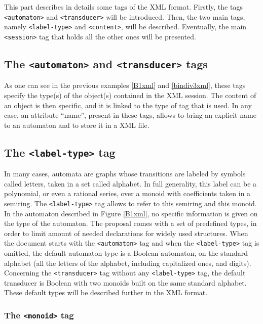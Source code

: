 \documentclass[a4paper]{article}
\def\typetag{\texttt{<label-type>}}
\def\contenttag{\texttt{<content>}}
\def\sessiontag{\texttt{<session>}}
\def\automatontag{\texttt{<automaton>}}
\def\transducertag{\texttt{<transducer>}}
\def\monoidtag{\texttt{<monoid>}}
\begin{document}
This part describes in details some tags of the XML format.
Firstly, the tags \automatontag{} and \transducertag{} will be introduced.
Then, the two main tags, namely \typetag{} and \contenttag{}, will be described.
Eventually, the main \sessiontag{} tag that holds all the other ones will be
presented.

\subsection{The \automatontag{} and \transducertag{} tags}

As one can see in the previous examples \ref{B1xml} and \ref{bindiv3xml}, these
tags specify the type(s) of the object(s) contained in the XML session. The content
of an object is then specific, and it is linked to the type of tag that is used.
In any case, an attribute ``name'', present in these tags, allows to bring an
explicit name to an automaton and to store it in a XML file.

\subsection{The \typetag{} tag}

In many cases, automata are graphs whose transitions are labeled by
symbols called letters, taken in a set called alphabet. In full
generality, this label can be a polynomial, or even a rational series,
over a monoid with coefficients taken in a semiring. The \typetag{}
tag allows to refer to this semiring and this monoid.\\

In the automaton described in Figure \ref{B1xml}, no specific
information is given on the type of the automaton. The proposal comes
with a set of predefined types, in order to limit amount of needed
declarations for widely used structures. When the document starts with
the \automatontag{} tag and when the \typetag{} tag is omitted,
the default automaton type is a Boolean automaton, on the standard
alphabet (all the letters of the alphabet, including capitalized ones, and digits).
Concerning the \transducertag{} tag without any \typetag{} tag, the default
transducer is Boolean with two monoids built on the same standard alphabet.
These default types will be described further in the XML format.


\subsubsection{The \monoidtag{} tag}
\end{document}
